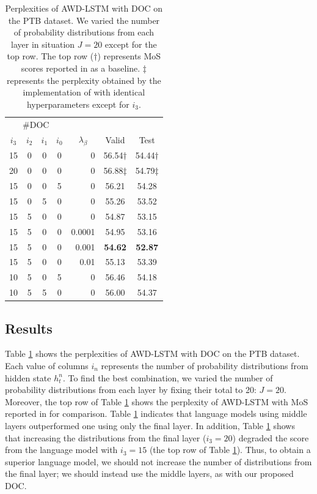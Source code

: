 \documentclass[11pt,a4paper]{article}
\begin{document}
\begin{table}[!t]
  \centering
  \small
  \begin{tabular}{| c c c c | r | c c |} \hline
  \multicolumn{4}{|c|}{\#DOC} & & & \\
  $i_3$ & $i_2$ & $i_1$ & $i_0$ & \multicolumn{1}{c|}{ $\lambda_{\beta}$ } & Valid & Test \\ \hline
  15 & 0 & 0 & 0 & 0 & 56.54$\dagger$ & 54.44$\dagger$ \\ \hline
  20 & 0 & 0 & 0 & 0 & 56.88$\ddagger$ & 54.79$\ddagger$ \\
  15 & 0 & 0 & 5 & 0 & 56.21 & 54.28 \\
  15 & 0 & 5 & 0 & 0 & 55.26 & 53.52 \\
  15 & 5 & 0 & 0 & 0 & 54.87 & 53.15 \\
  15 & 5 & 0 & 0 & 0.0001 & 54.95 & 53.16 \\
  15 & 5 & 0 & 0 & 0.001 & {\bf 54.62} & {\bf 52.87} \\
  15 & 5 & 0 & 0 & 0.01 & 55.13 & 53.39 \\
  10 & 5 & 0 & 5 & 0 & 56.46 & 54.18 \\
  10 & 5 & 5 & 0 & 0 & 56.00 & 54.37 \\ \hline
  \end{tabular}
  \caption{Perplexities of AWD-LSTM with DOC on the PTB dataset. We varied the number of probability distributions from each layer in situation $J=20$ except for the top row. The top row ($\dagger$) represents MoS scores reported in \protect{} as a baseline. $\ddagger$ represents the perplexity obtained by the implementation of \protect{}\protect\footnotemark[6] with identical hyperparameters except for $i_3$. \label{tb:search_doc}}
\end{table}
\addtocounter{footnote}{1}


\subsection{Results}
\label{Sec:lang_result}



Table \ref{tb:search_doc} shows the perplexities of AWD-LSTM with DOC on the PTB dataset.
Each value of columns $i_n$ represents the number of probability distributions from hidden state $h^n_t$.
To find the best combination, we varied the number of probability distributions from each layer by fixing their total to 20: $J=20$.
Moreover, the top row of Table \ref{tb:search_doc} shows the perplexity of AWD-LSTM with MoS reported in  for comparison.
Table \ref{tb:search_doc} indicates that language models using middle layers outperformed one using only the final layer.
In addition, Table \ref{tb:search_doc} shows that increasing the distributions from the final layer ($i_{3}=20$) degraded the score from the language model with $i_{3}=15$ (the top row of Table \ref{tb:search_doc}).
Thus, to obtain a superior language model, we should not increase the number of distributions from the final layer; we should instead use the middle layers, as with our proposed DOC.
\end{document}
